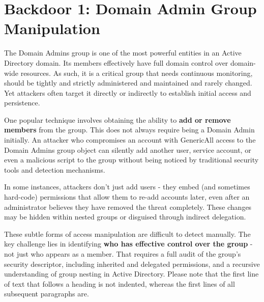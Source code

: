 \section{Backdoor 1: Domain Admin Group Manipulation}

The Domain Admins group is one of the most powerful entities in an Active Directory domain. Its members effectively have full domain control over domain-wide resources. As such, it is a critical group that needs continuous monitoring, should be tightly and strictly administered and maintained and rarely changed. Yet attackers often target it directly or indirectly to establish initial access and persistence.

One popular technique involves obtaining the ability to \textbf{add or remove members} from the group. This does not always require being a Domain Admin initially. An attacker who compromises an account with GenericAll access to the Domain Admins group object can silently add another user, service account, or even a malicious script to the group without being noticed by traditional security tools and detection mechanisms.

In some instances, attackers don't just add users - they embed (and sometimes hard-code) permissions that allow them to re-add accounts later, even after an administrator believes they have removed the threat completely. These changes may be hidden within nested groups or disguised through indirect delegation.

These subtle forms of access manipulation are difficult to detect manually. The key challenge lies in identifying \textbf{who has effective control over the group} - not just who appears as a member. That requires a full audit of the group's security descriptor, including inherited and delegated permissions, and a recursive understanding of group nesting in Active Directory.
Please note that the first line of text that follows a heading is not indented, whereas the first lines of all subsequent paragraphs are.

